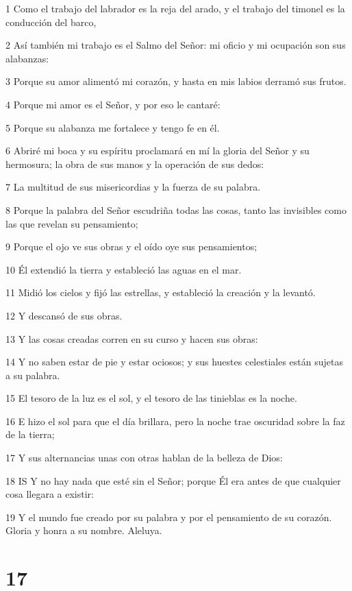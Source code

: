 \par 1 Como el trabajo del labrador es la reja del arado, y el trabajo del timonel es la conducción del barco,
\par 2 Así también mi trabajo es el Salmo del Señor: mi oficio y mi ocupación son sus alabanzas:
\par 3 Porque su amor alimentó mi corazón, y hasta en mis labios derramó sus frutos.
\par 4 Porque mi amor es el Señor, y por eso le cantaré:
\par 5 Porque su alabanza me fortalece y tengo fe en él.
\par 6 Abriré mi boca y su espíritu proclamará en mí la gloria del Señor y su hermosura; la obra de sus manos y la operación de sus dedos:
\par 7 La multitud de sus misericordias y la fuerza de su palabra.
\par 8 Porque la palabra del Señor escudriña todas las cosas, tanto las invisibles como las que revelan su pensamiento;
\par 9 Porque el ojo ve sus obras y el oído oye sus pensamientos;
\par 10 Él extendió la tierra y estableció las aguas en el mar.
\par 11 Midió los cielos y fijó las estrellas, y estableció la creación y la levantó.
\par 12 Y descansó de sus obras.
\par 13 Y las cosas creadas corren en su curso y hacen sus obras:
\par 14 Y no saben estar de pie y estar ociosos; y sus huestes celestiales están sujetas a su palabra.
\par 15 El tesoro de la luz es el sol, y el tesoro de las tinieblas es la noche.
\par 16 E hizo el sol para que el día brillara, pero la noche trae oscuridad sobre la faz de la tierra;
\par 17 Y sus alternancias unas con otras hablan de la belleza de Dios:
\par 18 IS Y no hay nada que esté sin el Señor; porque Él era antes de que cualquier cosa llegara a existir:
\par 19 Y el mundo fue creado por su palabra y por el pensamiento de su corazón. Gloria y honra a su nombre. Aleluya.

\chapter{17}

